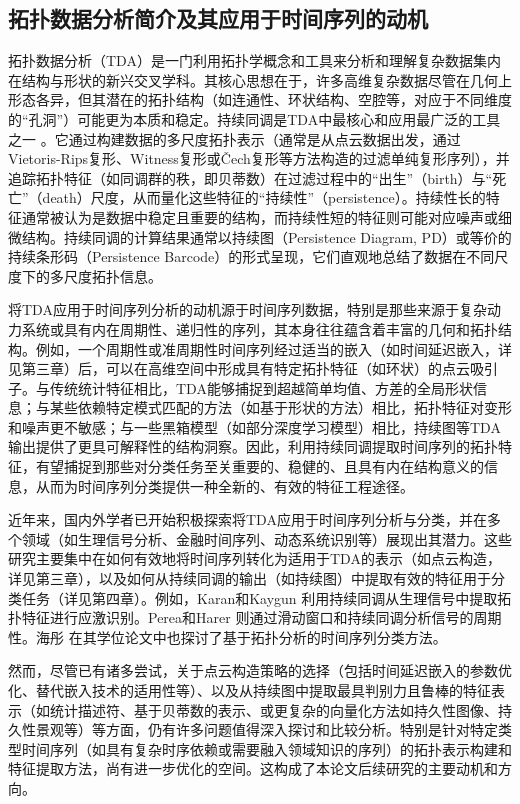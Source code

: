 \subsection{拓扑数据分析简介及其应用于时间序列的动机}
拓扑数据分析（TDA）是一门利用拓扑学概念和工具来分析和理解复杂数据集内在结构与形状的新兴交叉学科。其核心思想在于，许多高维复杂数据尽管在几何上形态各异，但其潜在的拓扑结构（如连通性、环状结构、空腔等，对应于不同维度的“孔洞”）可能更为本质和稳定。持续同调是TDA中最核心和应用最广泛的工具之一 \cite{zomorodian2004computing, dey2022computational}。它通过构建数据的多尺度拓扑表示（通常是从点云数据出发，通过Vietoris-Rips复形、Witness复形或Čech复形等方法构造的过滤单纯复形序列），并追踪拓扑特征（如同调群的秩，即贝蒂数）在过滤过程中的“出生”（birth）与“死亡”（death）尺度，从而量化这些特征的“持续性”（persistence）。持续性长的特征通常被认为是数据中稳定且重要的结构，而持续性短的特征则可能对应噪声或细微结构。持续同调的计算结果通常以持续图（Persistence Diagram, PD）或等价的持续条形码（Persistence Barcode）的形式呈现，它们直观地总结了数据在不同尺度下的多尺度拓扑信息。

将TDA应用于时间序列分析的动机源于时间序列数据，特别是那些来源于复杂动力系统或具有内在周期性、递归性的序列，其本身往往蕴含着丰富的几何和拓扑结构。例如，一个周期性或准周期性时间序列经过适当的嵌入（如时间延迟嵌入，详见第三章）后，可以在高维空间中形成具有特定拓扑特征（如环状）的点云吸引子\cite{takens2006detecting, perea2015sliding}。与传统统计特征相比，TDA能够捕捉到超越简单均值、方差的全局形状信息；与某些依赖特定模式匹配的方法（如基于形状的方法）相比，拓扑特征对变形和噪声更不敏感；与一些黑箱模型（如部分深度学习模型）相比，持续图等TDA输出提供了更具可解释性的结构洞察。因此，利用持续同调提取时间序列的拓扑特征，有望捕捉到那些对分类任务至关重要的、稳健的、且具有内在结构意义的信息，从而为时间序列分类提供一种全新的、有效的特征工程途径。

近年来，国内外学者已开始积极探索将TDA应用于时间序列分析与分类，并在多个领域（如生理信号分析\cite{3}、金融时间序列、动态系统识别\cite{mittal2017topological}等）展现出其潜力。这些研究主要集中在如何有效地将时间序列转化为适用于TDA的表示（如点云构造，详见第三章），以及如何从持续同调的输出（如持续图）中提取有效的特征用于分类任务（详见第四章）。例如，Karan和Kaygun \cite{3} 利用持续同调从生理信号中提取拓扑特征进行应激识别。Perea和Harer \cite{perea2015sliding} 则通过滑动窗口和持续同调分析信号的周期性。海彤 \cite{1021736289.nh} 在其学位论文中也探讨了基于拓扑分析的时间序列分类方法。

然而，尽管已有诸多尝试，关于点云构造策略的选择（包括时间延迟嵌入的参数优化、替代嵌入技术的适用性等）、以及从持续图中提取最具判别力且鲁棒的特征表示（如统计描述符、基于贝蒂数的表示、或更复杂的向量化方法如持久性图像、持久性景观等）等方面，仍有许多问题值得深入探讨和比较分析。特别是针对特定类型时间序列（如具有复杂时序依赖或需要融入领域知识的序列）的拓扑表示构建和特征提取方法，尚有进一步优化的空间。这构成了本论文后续研究的主要动机和方向。

